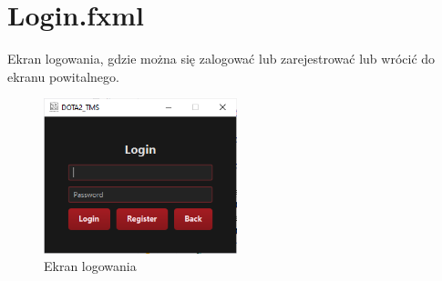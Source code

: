 \section{Login.fxml}
Ekran logowania, gdzie można się zalogować lub zarejestrować lub wrócić do ekranu powitalnego.
\begin{figure}[H]
    \centering
    \includegraphics[width=0.5\textwidth]{figures/Login1.png}
    \caption{Ekran logowania \label{fig:login}}
\end{figure}
